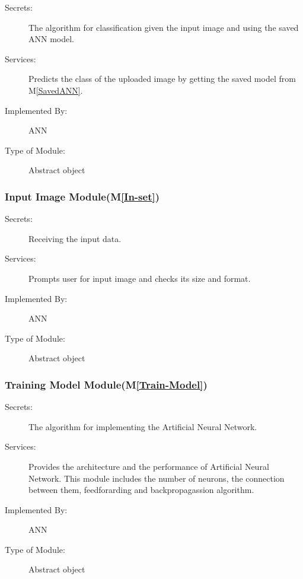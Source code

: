\documentclass[12pt, titlepage]{article}
\newcommand{\mref}[1]{M\ref{#1}}
\begin{document}
\begin{description}
  \item[Secrets:]The algorithm for classification given the input image and using the 
  saved ANN model.
  \item[Services:]Predicts the class of the uploaded image by getting the saved model from \mref{SavedANN}.
  \item[Implemented By:] ANN
  \item[Type of Module:] Abstract object
\end{description}


\subsubsection{Input Image Module(\mref{In-set})}

\begin{description}
  \item[Secrets:]Receiving the input data.
  \item[Services:]Prompts user for input image and checks its size and format.
  \item[Implemented By:] ANN
  \item[Type of Module:] Abstract object
\end{description}

\subsubsection{Training Model Module(\mref{Train-Model})}

\begin{description}
  \item[Secrets:]The algorithm for implementing the Artificial Neural Network.
  \item[Services:]Provides the architecture and the performance of Artificial Neural Network. 
  This module includes the number of neurons, the connection between them, feedforarding and backpropagassion 
  algorithm.
  \item[Implemented By:] ANN
  \item[Type of Module:] Abstract object
\end{description}


\end{document}

